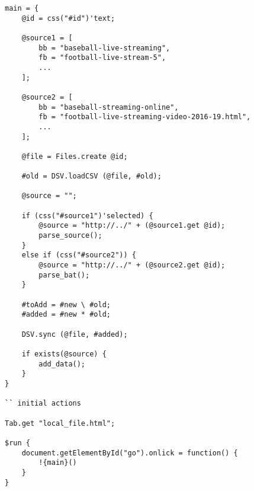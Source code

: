 \begin{lstlisting}
main = {
	@id = css("#id")'text;

	@source1 = [
		bb = "baseball-live-streaming",
		fb = "football-live-stream-5",
		...
	];

	@source2 = [
		bb = "baseball-streaming-online",
		fb = "football-live-streaming-video-2016-19.html",
		...
	];

	@file = Files.create @id;

	#old = DSV.loadCSV (@file, #old);

	@source = "";

	if (css("#source1")'selected) {
		@source = "http://../" + (@source1.get @id);
		parse_source();
	}
	else if (css("#source2")) {
		@source = "http://../" + (@source2.get @id);
		parse_bat();
	}

	#toAdd = #new \ #old;
	#added = #new * #old;
	
	DSV.sync (@file, #added);

	if exists(@source) {
		add_data();
	}
}

`` initial actions

Tab.get "local_file.html";

$run {
	document.getElementById("go").onlick = function() {
		!{main}()
	}
}
\end{lstlisting}
